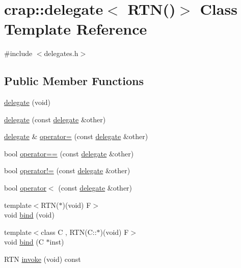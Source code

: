 \hypertarget{classcrap_1_1delegate_3_01_r_t_n_07_08_4}{\section{crap\+:\+:delegate$<$ R\+T\+N()$>$ Class Template Reference}
\label{classcrap_1_1delegate_3_01_r_t_n_07_08_4}
}


{\ttfamily \#include $<$delegates.\+h$>$}

\subsection*{Public Member Functions}
\begin{DoxyCompactItemize}
\item 
\hyperlink{classcrap_1_1delegate_3_01_r_t_n_07_08_4_ab5c7616fc5bcd793f4a4f3e8d5948b41}{delegate} (void)
\item 
\hyperlink{classcrap_1_1delegate_3_01_r_t_n_07_08_4_a1a39ae5dd32b5fbabd7fa622d6815185}{delegate} (const \hyperlink{classcrap_1_1delegate}{delegate} \&other)
\item 
\hyperlink{classcrap_1_1delegate}{delegate} \& \hyperlink{classcrap_1_1delegate_3_01_r_t_n_07_08_4_a493ae9a2e7e34e32c26fad47b0aa5bae}{operator=} (const \hyperlink{classcrap_1_1delegate}{delegate} \&other)
\item 
bool \hyperlink{classcrap_1_1delegate_3_01_r_t_n_07_08_4_a6630a3c07b082075a2325a55ceef4759}{operator==} (const \hyperlink{classcrap_1_1delegate}{delegate} \&other)
\item 
bool \hyperlink{classcrap_1_1delegate_3_01_r_t_n_07_08_4_a1987f79c4bae6b83e4d2804c9e18b8c1}{operator!=} (const \hyperlink{classcrap_1_1delegate}{delegate} \&other)
\item 
bool \hyperlink{classcrap_1_1delegate_3_01_r_t_n_07_08_4_abb5f06c8df681b701eb0c801549a4a1c}{operator$<$} (const \hyperlink{classcrap_1_1delegate}{delegate} \&other)
\item 
{\footnotesize template$<$R\+T\+N($\ast$)(void) F$>$ }\\void \hyperlink{classcrap_1_1delegate_3_01_r_t_n_07_08_4_abc067ce13356a910f2cb3beef18c8c29}{bind} (void)
\item 
{\footnotesize template$<$class C , R\+T\+N(\+C\+::$\ast$)(void) F$>$ }\\void \hyperlink{classcrap_1_1delegate_3_01_r_t_n_07_08_4_aa7d8e2721ca741ce9a1d85520c9e888a}{bind} (C $\ast$inst)
\item 
R\+T\+N \hyperlink{classcrap_1_1delegate_3_01_r_t_n_07_08_4_a47fc3428351b7d75b722a814fe068cf6}{invoke} (void) const 
\end{DoxyCompactItemize}


